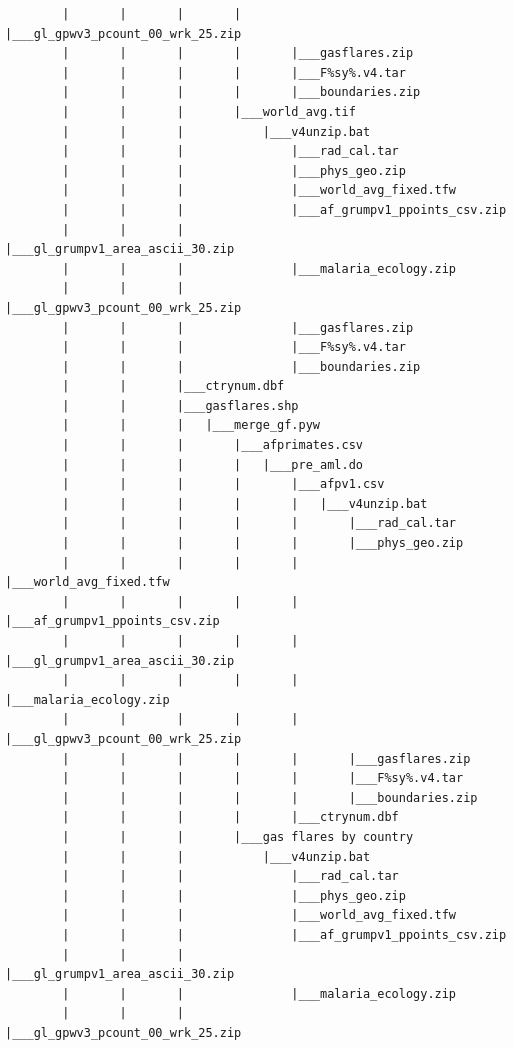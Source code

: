 \documentclass[]{book}
\begin{document}
\begin{verbatim}
        |       |       |       |       |___gl_gpwv3_pcount_00_wrk_25.zip
        |       |       |       |       |___gasflares.zip
        |       |       |       |       |___F%sy%.v4.tar
        |       |       |       |       |___boundaries.zip
        |       |       |       |___world_avg.tif
        |       |       |           |___v4unzip.bat
        |       |       |               |___rad_cal.tar
        |       |       |               |___phys_geo.zip
        |       |       |               |___world_avg_fixed.tfw
        |       |       |               |___af_grumpv1_ppoints_csv.zip
        |       |       |               |___gl_grumpv1_area_ascii_30.zip
        |       |       |               |___malaria_ecology.zip
        |       |       |               |___gl_gpwv3_pcount_00_wrk_25.zip
        |       |       |               |___gasflares.zip
        |       |       |               |___F%sy%.v4.tar
        |       |       |               |___boundaries.zip
        |       |       |___ctrynum.dbf
        |       |       |___gasflares.shp
        |       |       |   |___merge_gf.pyw
        |       |       |       |___afprimates.csv
        |       |       |       |   |___pre_aml.do
        |       |       |       |       |___afpv1.csv
        |       |       |       |       |   |___v4unzip.bat
        |       |       |       |       |       |___rad_cal.tar
        |       |       |       |       |       |___phys_geo.zip
        |       |       |       |       |       |___world_avg_fixed.tfw
        |       |       |       |       |       |___af_grumpv1_ppoints_csv.zip
        |       |       |       |       |       |___gl_grumpv1_area_ascii_30.zip
        |       |       |       |       |       |___malaria_ecology.zip
        |       |       |       |       |       |___gl_gpwv3_pcount_00_wrk_25.zip
        |       |       |       |       |       |___gasflares.zip
        |       |       |       |       |       |___F%sy%.v4.tar
        |       |       |       |       |       |___boundaries.zip
        |       |       |       |       |___ctrynum.dbf
        |       |       |       |___gas flares by country
        |       |       |           |___v4unzip.bat
        |       |       |               |___rad_cal.tar
        |       |       |               |___phys_geo.zip
        |       |       |               |___world_avg_fixed.tfw
        |       |       |               |___af_grumpv1_ppoints_csv.zip
        |       |       |               |___gl_grumpv1_area_ascii_30.zip
        |       |       |               |___malaria_ecology.zip
        |       |       |               |___gl_gpwv3_pcount_00_wrk_25.zip

\end{verbatim}
\end{document}
